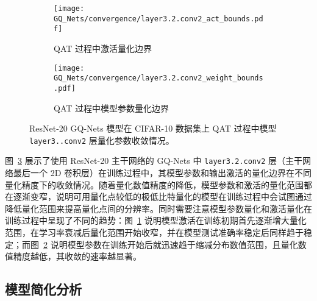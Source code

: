 \begin{figure}[htb]
  \centering
  \begin{subfigure}[t]{0.45\columnwidth}
    \centering
    \texttt{[image: GQ\_Nets/convergence/layer3.2.conv2\_act\_bounds.pdf]}
    \caption{QAT 过程中激活量化边界}
    \label{img::gq_nets::act_bounds}
  \end{subfigure}
  \quad
  \begin{subfigure}[t]{0.45\columnwidth}
    \centering
    \texttt{[image: GQ\_Nets/convergence/layer3.2.conv2\_weight\_bounds.pdf]}
    \caption{QAT 过程中模型参数量化边界}
    \label{img::gq_nets::weight_bounds}
  \end{subfigure}
  \caption{ResNet-20 GQ-Nets 模型在 CIFAR-10 数据集上 QAT 过程中模型 \texttt{layer3..\-conv2} 层量化参数收敛情况。}
  \label{img::gq_nets::res20_quant_bounds}
\end{figure}

图~\ref{img::gq_nets::res20_quant_bounds} 展示了使用 ResNet-20 主干网络的 GQ-Nets 中 \verb|layer3.2.conv2| 层（主干网络最后一个 2D 卷积层）在训练过程中，其模型参数和输出激活的量化边界在不同量化精度下的收敛情况。随着量化数值精度的降低，模型参数和激活的量化范围都在逐渐变窄，说明可用量化点较低的极低比特量化的模型在训练过程中会试图通过降低量化范围来提高量化点间的分辨率。同时需要注意模型参数量化和激活量化在训练过程中呈现了不同的趋势：图~\ref{img::gq_nets::act_bounds} 说明模型激活在训练初期首先逐渐增大量化范围，在学习率衰减后量化范围开始收窄，并在模型测试准确率稳定后同样趋于稳定；而图~\ref{img::gq_nets::weight_bounds} 说明模型参数在训练开始后就迅速趋于缩减分布数值范围，且量化数值精度越低，其收敛的速率越显著。
\subsection{模型简化分析} \label{sec::gq_nets::ablation_study}

